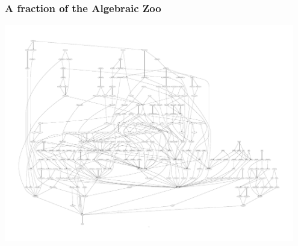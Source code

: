 \documentclass{beamer}
\begin{document}
\begin{frame}[t]
\frametitle{A fraction of the Algebraic Zoo}
\vspace*{-0.8cm}\includegraphics[height=9.5cm]{fragment.pdf}
\end{frame}
\end{document}
